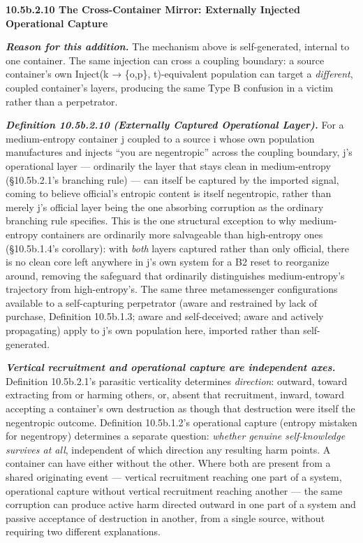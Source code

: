 \documentclass[
]{article}
\begin{document}
\textbf{10.5b.2.10 The Cross-Container Mirror: Externally Injected
Operational Capture}

\emph{\textbf{Reason for this addition.}} The mechanism above is
self-generated, internal to one container. The same injection can cross
a coupling boundary: a source container's own Inject(k → \{o,p\},
t)-equivalent population can target a \emph{different}, coupled
container's layers, producing the same Type B confusion in a victim
rather than a perpetrator.

\emph{\textbf{Definition 10.5b.2.10 (Externally Captured Operational
Layer).}} For a medium-entropy container j coupled to a source i whose
own population manufactures and injects ``you are negentropic'' across
the coupling boundary, j's operational layer --- ordinarily the layer
that stays clean in medium-entropy (§10.5b.2.1's branching rule) --- can
itself be captured by the imported signal, coming to believe official's
entropic content is itself negentropic, rather than merely j's official
layer being the one absorbing corruption as the ordinary branching rule
specifies. This is the one structural exception to why medium-entropy
containers are ordinarily more salvageable than high-entropy ones
(§10.5b.1.4's corollary): with \emph{both} layers captured rather than
only official, there is no clean core left anywhere in j's own system
for a B2 reset to reorganize around, removing the safeguard that
ordinarily distinguishes medium-entropy's trajectory from
high-entropy's. The same three metamessenger configurations available to
a self-capturing perpetrator (aware and restrained by lack of purchase,
Definition 10.5b.1.3; aware and self-deceived; aware and actively
propagating) apply to j's own population here, imported rather than
self-generated.

\emph{\textbf{Vertical recruitment and operational capture are
independent axes.}} Definition 10.5b.2.1's parasitic verticality
determines \emph{direction}: outward, toward extracting from or harming
others, or, absent that recruitment, inward, toward accepting a
container's own destruction as though that destruction were itself the
negentropic outcome. Definition 10.5b.1.2's operational capture (entropy
mistaken for negentropy) determines a separate question: \emph{whether
genuine self-knowledge survives at all}, independent of which direction
any resulting harm points. A container can have either without the
other. Where both are present from a shared originating event ---
vertical recruitment reaching one part of a system, operational
capture without vertical recruitment reaching another --- the same corruption can
produce active harm directed outward in one part of a system and passive
acceptance of destruction in another, from a single source, without
requiring two different explanations.
\end{document}
